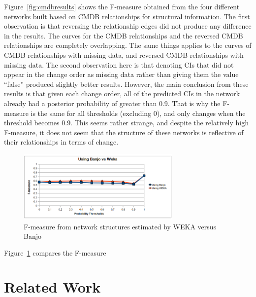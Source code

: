 \documentclass{article}
\begin{document}
Figure~\ref{fig:cmdbresults} shows the F-measure obtained from the four different networks built based on CMDB relationships for structural information. The
first observation is that reversing the relationship edges did not produce any difference in the results. The curves for the CMDB relationships and the reversed
CMDB relationships are completely overlapping. The same things applies to the curves of CMDB relationships with missing data, and reversed CMDB relationships
with missing data. The second observation here is that denoting CIs that did not appear in the change order as missing data rather than giving them the value
``false'' produced slightly better results. However, the main conclusion from these results is that given each change order, all of the predicted CIs in the
network already had a posterior probability of greater than 0.9. That is why the F-measure is the same for all thresholds (excluding 0), and only
changes when the threshold becomes 0.9. This seems rather strange, and despite the relatively high F-measure, it does not seem that the structure
of these networks is reflective of their relationships in terms of change.

\begin{figure}[!t]
\centering
\includegraphics[width=8cm]{graphics/banjowekares.png}
\caption{F-measure from network structures estimated by WEKA versus Banjo}
\label{fig:wekabnj}
\end{figure}

Figure~\ref{fig:wekabnj} compares the F-measure

\section{Related Work}
\label{rel-work}
\end{document}
